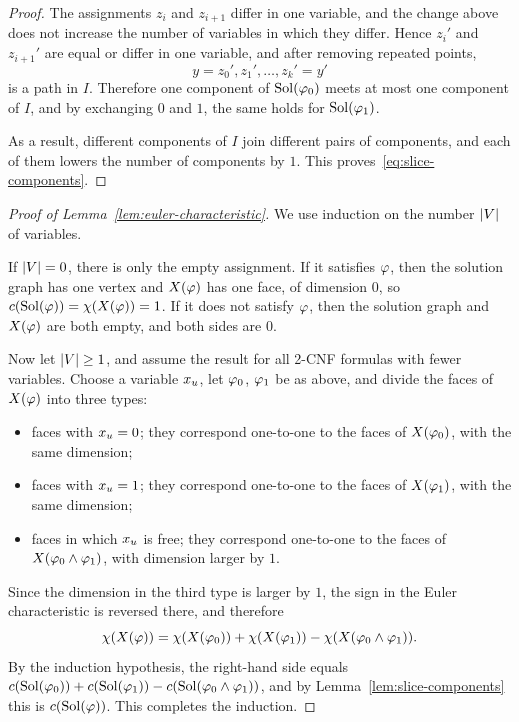 \begin{proof}
The assignments \(z_i\) and \(z_{i+1}\) differ in one variable, and the change
above does not increase the number of variables in which they differ. Hence
\(z_i'\) and \(z_{i+1}'\) are equal or differ in one variable, and after
removing repeated points,
\[
  y=z_0',z_1',\ldots,z_k'=y'
\]
is a path in \(I\). Therefore one component of \(\operatorname{Sol}(\varphi_0)\) meets at most
one component of \(I\), and by exchanging \(0\) and \(1\), the same holds for
\(\operatorname{Sol}(\varphi_1)\).

As a result, different components of \(I\) join different pairs of
components, and each of them lowers the number of components by \(1\). This
proves~\eqref{eq:slice-components}.
\end{proof}

\begin{proof}[Proof of Lemma~\ref{lem:euler-characteristic}]
We use induction on the number \(|V|\) of variables.

If \(|V|=0\), there is only the empty assignment. If it satisfies \(\varphi\),
then the solution graph has one vertex and \(X(\varphi)\) has one face, of
dimension \(0\), so \(c(\operatorname{Sol}(\varphi))=\chi(X(\varphi))=1\). If it does not
satisfy \(\varphi\), then the solution graph and \(X(\varphi)\) are both empty,
and both sides are \(0\).

Now let \(|V|\ge1\), and assume the result for all 2-CNF formulas with
fewer variables. Choose a variable \(x_{u}\), let \(\varphi_0\), \(\varphi_1\) be
as above, and divide the faces of \(X(\varphi)\) into three types:
\begin{itemize}
\item faces with \(x_{u}=0\); they correspond one-to-one to the faces of
  \(X(\varphi_0)\), with the same dimension;
\item faces with \(x_{u}=1\); they correspond one-to-one to the faces of
  \(X(\varphi_1)\), with the same dimension;
\item faces in which \(x_{u}\) is free; they correspond one-to-one to the
  faces of \(X(\varphi_0\wedge\varphi_1)\), with dimension larger by \(1\).
\end{itemize}
Since the dimension in the third type is larger by \(1\), the sign in the Euler
characteristic is reversed there, and therefore
\begin{equation}\label{eq:euler-slice}
  \chi(X(\varphi))
  =
  \chi(X(\varphi_0))
  +
  \chi(X(\varphi_1))
  -
  \chi(X(\varphi_0\wedge\varphi_1)).
\end{equation}
By the induction hypothesis, the right-hand side equals
\(c(\operatorname{Sol}(\varphi_0))+c(\operatorname{Sol}(\varphi_1))-c(\operatorname{Sol}(\varphi_0\wedge\varphi_1))\), and by
Lemma~\ref{lem:slice-components} this is \(c(\operatorname{Sol}(\varphi))\). This completes the
induction.
\end{proof}


